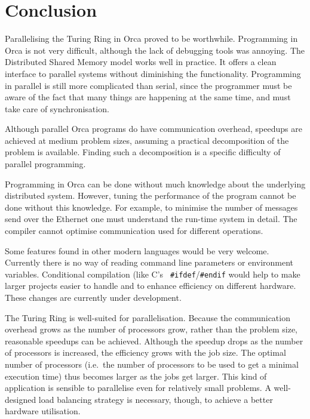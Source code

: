 \section{Conclusion}

Parallelising the Turing Ring in Orca proved to be worthwhile.
Programming in Orca is not very difficult, although the lack of 
debugging tools was annoying. The Distributed Shared Memory model
works well in practice. It offers a clean interface to parallel
systems without diminishing the functionality.
Programming in parallel is still more complicated than serial, since
the
programmer must be aware of the fact that many things are happening at
the same time, and must take care of synchronisation.

\begin{sloppypar}
Although parallel
Orca programs do have communication overhead, speedups are achieved at medium
problem sizes, assuming a practical decomposition of the problem is
available. Finding such a decomposition is a specific difficulty
of parallel programming.
\end{sloppypar}

Programming in Orca can be done without much knowledge about the
underlying distributed system. However, tuning the performance of the program
cannot be done without this knowledge. 
For example, to minimise the number of messages send over the Ethernet
one must understand the run-time system in detail. The compiler cannot
optimise communication used for different operations. 

Some features found in other modern languages would be very welcome.
Currently there is no way of reading command line parameters or
environment variables. Conditional compilation (like C's {\tt
\#ifdef}/{\tt \#endif} would help to make larger projects easier to
handle and to enhance efficiency on different hardware. These changes
are currently under development.

The Turing Ring is well-suited for parallelisation. Because the
communication overhead grows as the number of processors grow, rather
than the problem size,
reasonable speedups can be achieved.
Although the speedup drops as the number of processors is increased,
the efficiency grows with the job size. The optimal number of
processors (i.e.\ the number of processors to be used to get a minimal
execution time) thus becomes larger as the jobs get larger. 
This kind of application is sensible to parallelise even for relatively
small problems.
A well-designed load balancing
strategy is necessary, though, to achieve a better hardware
utilisation. 

